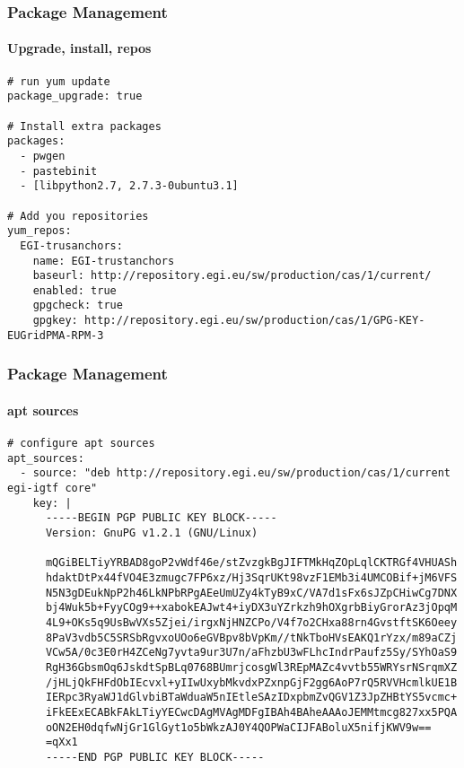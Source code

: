 
\begin{frame}[fragile]
  \frametitle{Package Management}
  \framesubtitle{Upgrade, install, repos}

  \begin{Sbox}
  \Fontsmaller
  \begin{minipage}{\linewidth-2\fboxsep-2\fboxrule-4pt}
  \color{white}
  \begin{verbatim}
# run yum update 
package_upgrade: true

# Install extra packages
packages:
  - pwgen
  - pastebinit
  - [libpython2.7, 2.7.3-0ubuntu3.1]

# Add you repositories
yum_repos:
  EGI-trusanchors:
    name: EGI-trustanchors
    baseurl: http://repository.egi.eu/sw/production/cas/1/current/
    enabled: true
    gpgcheck: true
    gpgkey: http://repository.egi.eu/sw/production/cas/1/GPG-KEY-EUGridPMA-RPM-3
  \end{verbatim}
  \end{minipage}
  \end{Sbox}


\end{frame}


\begin{frame}[fragile]
  \frametitle{Package Management}
  \framesubtitle{apt sources}

  \begin{Sbox}
  \tiny
  \begin{minipage}{\linewidth-2\fboxsep-2\fboxrule-4pt}
  \color{white}
  \begin{verbatim}
# configure apt sources
apt_sources:
  - source: "deb http://repository.egi.eu/sw/production/cas/1/current egi-igtf core"
    key: |
      -----BEGIN PGP PUBLIC KEY BLOCK-----
      Version: GnuPG v1.2.1 (GNU/Linux)

      mQGiBELTiyYRBAD8goP2vWdf46e/stZvzgkBgJIFTMkHqZOpLqlCKTRGf4VHUASh
      hdaktDtPx44fVO4E3zmugc7FP6xz/Hj3SqrUKt98vzF1EMb3i4UMCOBif+jM6VFS
      N5N3gDEukNpP2h46LkNPbRPgAEeUmUZy4kTyB9xC/VA7d1sFx6sJZpCHiwCg7DNX
      bj4Wuk5b+FyyCOg9++xabokEAJwt4+iyDX3uYZrkzh9hOXgrbBiyGrorAz3jOpqM
      4L9+OKs5q9UsBwVXs5Zjei/irgxNjHNZCPo/V4f7o2CHxa88rn4GvstftSK6Oeey
      8PaV3vdb5C5SRSbRgvxoUOo6eGVBpv8bVpKm//tNkTboHVsEAKQ1rYzx/m89aCZj
      VCw5A/0c3E0rH4ZCeNg7yvta9ur3U7n/aFhzbU3wFLhcIndrPaufz5Sy/SYhOaS9
      RgH36GbsmOq6JskdtSpBLq0768BUmrjcosgWl3REpMAZc4vvtb55WRYsrNSrqmXZ
      /jHLjQkFHFdObIEcvxl+yIIwUxybMkvdxPZxnpGjF2gg6AoP7rQ5RVVHcmlkUE1B
      IERpc3RyaWJ1dGlvbiBTaWduaW5nIEtleSAzIDxpbmZvQGV1Z3JpZHBtYS5vcmc+
      iFkEExECABkFAkLTiyYECwcDAgMVAgMDFgIBAh4BAheAAAoJEMMtmcg827xx5PQA
      oON2EH0dqfwNjGr1GlGyt1o5bWkzAJ0Y4QOPWaCIJFABoluX5nifjKWV9w==
      =qXx1
      -----END PGP PUBLIC KEY BLOCK-----
  \end{verbatim}
  \end{minipage}
  \end{Sbox}


\end{frame}

